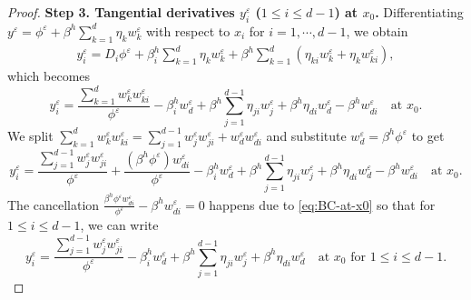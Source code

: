 \documentclass[11pt]{article}
\numberwithin{equation}{section}
\def\le{\leqslant}
\begin{document}
\begin{proof}
\textbf{Step 3. Tangential derivatives $y^\varepsilon_i$ ($1 \le i \le d-1$) at $x_0$.} Differentiating $y^\varepsilon = \phi^\varepsilon + \beta^h \sum_{k=1}^d \eta_k w^\varepsilon_k$ with respect to $x_i$ for $i=1,\cdots,d-1$, we obtain
\begin{align*}
y^\varepsilon_i = D_i \phi^\varepsilon + \beta^h_i \sum_{k=1}^d \eta_k w^\varepsilon_k + \beta^h \sum_{k=1}^d (\eta_{ki} w^\varepsilon_k + \eta_k w^\varepsilon_{ki}),    
\end{align*}
which becomes
\[
\displaystyle y^\varepsilon_i = \frac{\sum_{k=1}^d w^\varepsilon_k w^\varepsilon_{ki}}{\phi^\varepsilon} - \beta^h_i w^\varepsilon_d + \beta^h \sum_{j=1}^{d-1} \eta_{ji} w^\varepsilon_j + \beta^h \eta_{di} w^\varepsilon_d - \beta^h w^\varepsilon_{di}\quad\text{at }x_0.
\]
We split $\sum_{k=1}^d w^\varepsilon_k w^\varepsilon_{ki} = \sum_{j=1}^{d-1} w^\varepsilon_j w^\varepsilon_{ji} + w^\varepsilon_d w^\varepsilon_{di}$ and substitute $w^\varepsilon_d = \beta^h \phi^\varepsilon$ to get
\[
\displaystyle y^\varepsilon_i = \frac{\sum_{j=1}^{d-1} w^\varepsilon_j w^\varepsilon_{ji}}{\phi^\varepsilon} + \frac{(\beta^h \phi^\varepsilon) w^\varepsilon_{di}}{\phi^\varepsilon} - \beta^h_i w^\varepsilon_d + \beta^h \sum_{j=1}^{d-1} \eta_{ji} w^\varepsilon_j + \beta^h \eta_{di} w^\varepsilon_d - \beta^h w^\varepsilon_{di}\quad\text{at }x_0.
\]
The cancellation $\frac{\beta^h \phi^\varepsilon w^\varepsilon_{di}}{\phi^\varepsilon} - \beta^h w^\varepsilon_{di} = 0$ happens due to \eqref{eq:BC-at-x0} so that for $1 \le i \le d-1$, we can write
\begin{equation} \label{eq:yi}
y^\varepsilon_i = \frac{\sum_{j=1}^{d-1} w^\varepsilon_j w^\varepsilon_{ji}}{\phi^\varepsilon} - \beta^h_i w^\varepsilon_d + \beta^h \sum_{j=1}^{d-1} \eta_{ji} w^\varepsilon_j + \beta^h \eta_{di} w^\varepsilon_d\quad\text{at $x_0$ for $1 \le i \le d-1$}. 
\end{equation}



\medskip


\end{proof}
\end{document}
